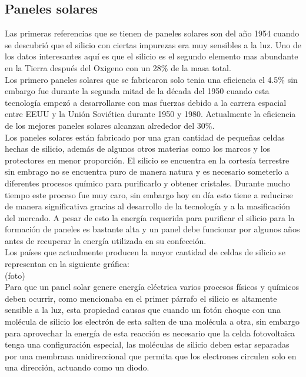 \subsection{Paneles solares}
Las primeras referencias que se tienen de paneles solares son del año 1954 cuando se descubrió que el silicio con ciertas impurezas era muy sensibles a la luz. Uno de los datos interesantes aquí es que el silicio es el segundo elemento mas abundante en la Tierra después del Oxigeno con un 28\% de la masa total.
\\

Los primero paneles solares que se fabricaron solo tenia una eficiencia el 4.5\% sin embargo fue durante la segunda mitad de la década del 1950 cuando esta tecnología empezó a desarrollarse con mas fuerzas debido a la carrera espacial entre EEUU y la Unión Soviética durante 1950 y 1980. Actualmente la eficiencia de los mejores paneles solares alcanzan alrededor del 30\%.\\

Los paneles solares están fabricado por una gran cantidad de pequeñas celdas hechas de silicio, además de algunos otros materias como los marcos y los protectores en menor proporción. El silicio se encuentra en la cortesía terrestre sin embrago no se encuentra puro de manera natura y es necesario someterlo a diferentes procesos químico para purificarlo y obtener cristales. Durante mucho tiempo este proceso fue muy caro, sin embargo hoy en día esto tiene a reducirse de manera significativa gracias al desarrollo de la tecnología y a la masificación del mercado. A pesar de esto la energía requerida para purificar el silicio para la formación de paneles es bastante alta y un panel debe funcionar por algunos años antes de recuperar la energía utilizada en su confección.\\

Los países que actualmente producen la mayor cantidad de celdas de silicio se representan en la siguiente gráfica:\\

(foto)\\

Para que un panel solar genere energía eléctrica varios procesos físicos y químicos deben ocurrir, como mencionaba en el primer párrafo el silicio es altamente sensible a la luz, esta propiedad causas que cuando un fotón choque con una molécula de silicio los electrón de esta salten de una molécula a otra, sin embargo para aprovechar la energía de esta reacción es necesario que la celda fotovoltaica tenga una configuración especial, las moléculas de silicio deben estar separadas por una membrana unidireccional que permita que los electrones circulen solo en una dirección, actuando como un diodo.\\

